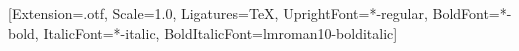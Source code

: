 \usepackage{threeparttable}
\newfontfamily{}[Extension=.otf, Scale=1.0, Ligatures=TeX,
  UprightFont=*-regular, BoldFont=*-bold, ItalicFont=*-italic,
  BoldItalicFont=lmroman10-bolditalic]
\newenvironment{econtable}[2]{%
  \par\vspace{0.2em}\centering\paperfont\fontsize{#1}{#2}\selectfont\color{black}%
  \arrayrulecolor{black}\setlength{\tabcolsep}{0.8em}%
  \setlength{\aboverulesep}{0.3ex}\setlength{\belowrulesep}{0.5ex}%
  \renewcommand{\defaultaddspace}{0.5em}%
  \begin{threeparttable}}{\end{threeparttable}\par}
\newcommand{\econnotes}[1]{%
  \begin{tablenotes}[flushleft]\setlength{\labelsep}{0pt}\fontsize{5.9}{7}\selectfont
  \item[]\textit{Notes:} #1\end{tablenotes}}
\newcommand{\sym}[1]{\rlap{$^{#1}$}}
\newcommand{\stars}[2]{$^{#1}$\,\textit{p}\,<\,#2}
